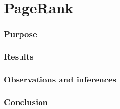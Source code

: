 \section{PageRank}

\subsubsection{Purpose}

\todo

\subsubsection{Results}

\todo

\subsubsection{Observations and inferences}

\todo

\subsubsection{Conclusion}

\todo